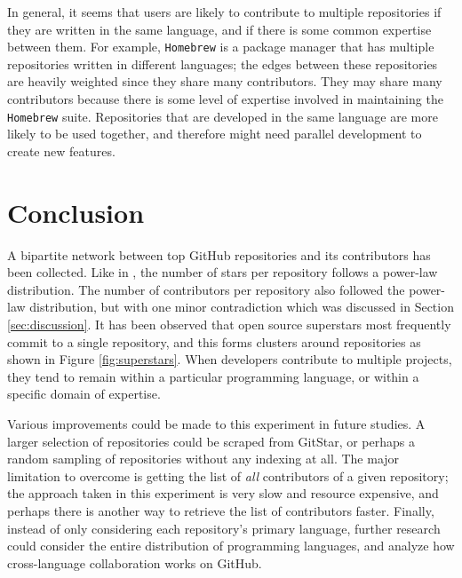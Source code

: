\documentclass[11pt]{article}
\begin{document}
In general, it seems that users are likely to contribute to multiple repositories if they are written in the same language, and if there is some common expertise between them. For example, \texttt{Homebrew} is a package manager that has multiple repositories written in different languages; the edges between these repositories are heavily weighted since they share many contributors. They may share many contributors because there is some level of expertise involved in maintaining the \texttt{Homebrew} suite. Repositories that are developed in the same language are more likely to be used together, and therefore might need parallel development to create new features.



\section{Conclusion}
\label{sec:conclusion}
A bipartite network between top GitHub repositories and its contributors has been collected. Like in \cite{paper}, the number of stars per repository follows a power-law distribution. The number of contributors per repository also followed the power-law distribution, but with one minor contradiction which was discussed in Section \ref{sec:discussion}. It has been observed that open source superstars most frequently commit to a single repository, and this forms clusters around repositories as shown in Figure \ref{fig:superstars}. When developers contribute to multiple projects, they tend to remain within a particular programming language, or within a specific domain of expertise.

Various improvements could be made to this experiment in future studies. A larger selection of repositories could be scraped from GitStar, or perhaps a random sampling of repositories without any indexing at all. The major limitation to overcome is getting the list of \emph{all} contributors of a given repository; the approach taken in this experiment is very slow and resource expensive, and perhaps there is another way to retrieve the list of contributors faster. Finally, instead of only considering each repository's primary language, further research could consider the entire distribution of programming languages, and analyze how cross-language collaboration works on GitHub.


\newpage


\end{document}
